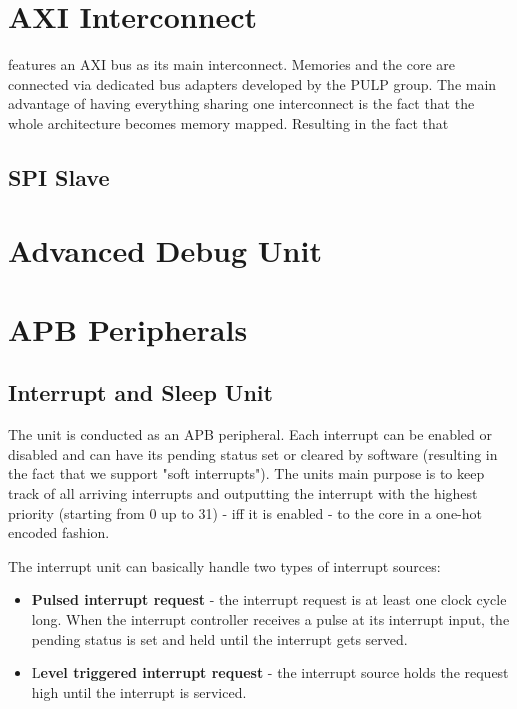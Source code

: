 \section{AXI Interconnect}

\pulpino features an AXI bus as its main interconnect. Memories and the core are connected via dedicated bus adapters developed by the PULP group. The main advantage of having everything sharing one interconnect is the fact that the whole architecture becomes memory mapped. Resulting in the fact that 


\subsection{SPI Slave}


\section{Advanced Debug Unit}

\section{APB Peripherals}

\subsection{Interrupt and Sleep Unit}

The unit is conducted as an APB peripheral. Each interrupt can be enabled or disabled and can have its pending status set or cleared by software (resulting in the fact that we support "soft interrupts"). The units main purpose is to keep track of all arriving interrupts and outputting the interrupt with the highest priority (starting from 0 up to 31) - iff it is enabled -  to the core in a one-hot encoded fashion. 

The interrupt unit can basically handle two types of interrupt sources:

\begin{itemize}
    \item \textbf{Pulsed interrupt request} - the interrupt request is at least one clock cycle long. When the interrupt controller receives a pulse at its interrupt input, the pending status is set and held until the interrupt gets served.
    \item L\textbf{evel triggered interrupt request} - the interrupt source holds the request high until the interrupt is serviced.
\end{itemize}

